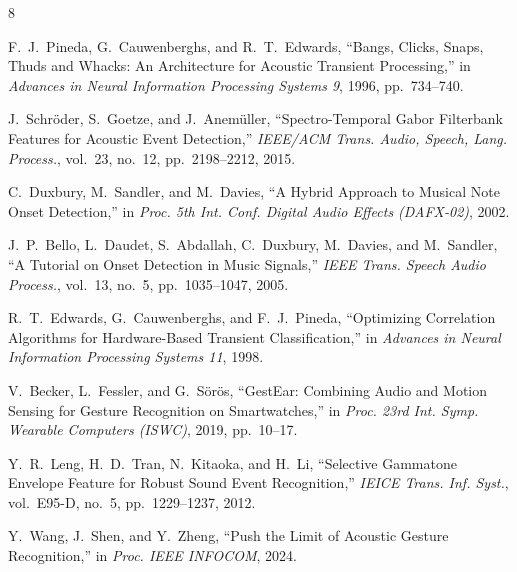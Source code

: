 \documentclass[12pt,a4paper]{article}
\begin{document}
\begin{thebibliography}{8}

 F.~J.~Pineda, G.~Cauwenberghs, and R.~T.~Edwards,
``Bangs, Clicks, Snaps, Thuds and Whacks: An Architecture for Acoustic Transient Processing,''
in \textit{Advances in Neural Information Processing Systems 9}, 1996, pp.~734--740.

 J.~Schr\"oder, S.~Goetze, and J.~Anem\"uller,
``Spectro-Temporal Gabor Filterbank Features for Acoustic Event Detection,''
\textit{IEEE/ACM Trans. Audio, Speech, Lang. Process.}, vol.~23, no.~12, pp.~2198--2212, 2015.

 C.~Duxbury, M.~Sandler, and M.~Davies,
``A Hybrid Approach to Musical Note Onset Detection,''
in \textit{Proc. 5th Int. Conf. Digital Audio Effects (DAFX-02)}, 2002.

 J.~P.~Bello, L.~Daudet, S.~Abdallah, C.~Duxbury, M.~Davies, and M.~Sandler,
``A Tutorial on Onset Detection in Music Signals,''
\textit{IEEE Trans. Speech Audio Process.}, vol.~13, no.~5, pp.~1035--1047, 2005.

 R.~T.~Edwards, G.~Cauwenberghs, and F.~J.~Pineda,
``Optimizing Correlation Algorithms for Hardware-Based Transient Classification,''
in \textit{Advances in Neural Information Processing Systems 11}, 1998.

 V.~Becker, L.~Fessler, and G.~S\"or\"os,
``GestEar: Combining Audio and Motion Sensing for Gesture Recognition on Smartwatches,''
in \textit{Proc. 23rd Int. Symp. Wearable Computers (ISWC)}, 2019, pp.~10--17.

 Y.~R.~Leng, H.~D.~Tran, N.~Kitaoka, and H.~Li,
``Selective Gammatone Envelope Feature for Robust Sound Event Recognition,''
\textit{IEICE Trans. Inf. Syst.}, vol.~E95-D, no.~5, pp.~1229--1237, 2012.

 Y.~Wang, J.~Shen, and Y.~Zheng, 
``Push the Limit of Acoustic Gesture Recognition,'' 
in \textit{Proc. IEEE INFOCOM}, 2024.

\end{thebibliography}
\end{document}
